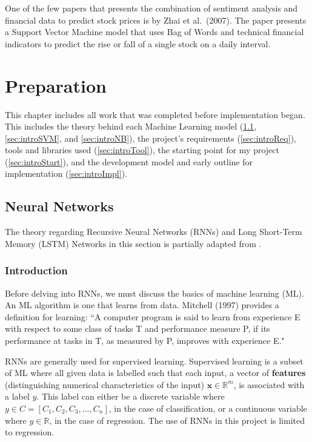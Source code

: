 \documentclass[12pt,a4paper,twoside,openright]{report}
\renewcommand{\vec}[1]{\mathbf{#1}}
\newcommand{\R}{\mathbb{R}}
\begin{document}
One of the few papers that presents the combination of sentiment analysis and financial data to predict stock
prices is by Zhai et al.\ (2007)\cite{Zhai07}. The paper presents a Support Vector Machine model that uses Bag of Words
and technical financial indicators to predict the rise or fall of a single stock on a daily interval.

\chapter{Preparation}
\label{sec:prep}

This chapter includes all work that was completed before implementation began.
This includes the theory behind each Machine Learning model (\cref{sec:introNN},
\cref{sec:introSVM}, and \cref{sec:introNB}), 
the project's requirements (\cref{sec:introReq}), tools and libraries
used (\cref{sec:introTool}), the starting point
for my project (\cref{sec:introStart}), and the development model and
early outline for implementation (\cref{sec:introImpl}).

\section{Neural Networks}
\label{sec:introNN}

The theory regarding Recursive Neural Networks (RNNs) and
Long Short-Term Memory (LSTM) Networks in this section is partially adapted from \cite{Goodfellow-et-al-2016,
Hochreiter97, Gers99, Graves13}.

\subsection{Introduction}

Before delving into RNNs, we must discuss
the basics of machine learning (ML). An ML algorithm is one that learns from
data. Mitchell (1997) provides a definition for learning:
``A computer program is said to learn from experience E with respect to some
class of tasks T and performance measure P, if its performance at tasks in T, as
measured by P, improves with experience E."\cite{Mitchell97} 

RNNs are generally used for
supervised learning. Supervised learning is a subset of ML
where all given data is labelled such that each input, a vector of \textbf{features} (distinguishing
numerical characteristics of the input) $\vec{x} \in \R^m$,
is associated with a label $y$. This label can either be a discrete variable where 
$y \in C = [C_1, C_2, C_3, ..., C_n]$,
in the case of classification, or a continuous variable where $y \in \R$, in the case of regression.
The use of RNNs in this project is limited to regression.
\end{document}
